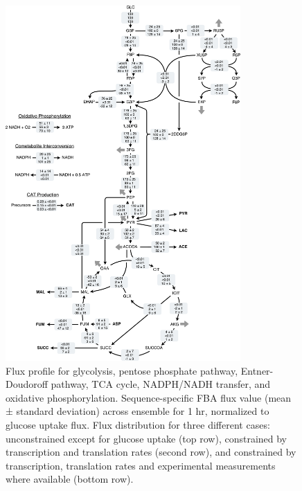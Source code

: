 \documentclass[12pt]{article}
\begin{document}
\begin{figure}[ht]
\centering
\includegraphics[width=0.8\textwidth]{./Figures/CAT_flux_final.pdf}
\caption{Flux profile for glycolysis, pentose phosphate pathway, Entner-Doudoroff pathway, TCA cycle, NADPH/NADH transfer, and oxidative phosphorylation. Sequence-specific FBA flux value (mean ± standard deviation) across ensemble for 1 hr, normalized to glucose uptake flux. Flux distribution for three different cases: unconstrained except for glucose uptake (top row), constrained by transcription and translation rates (second row), and constrained by transcription, translation rates and experimental measurements where available (bottom row).}
\label{fig:Network}
\end{figure}

\clearpage

\renewcommand\thefigure{S\arabic{figure}}
\renewcommand\thetable{T\arabic{table}}
\renewcommand\thepage{S-\arabic{page}}
\renewcommand\theequation{S\arabic{equation}}

\setcounter{equation}{0}
\setcounter{table}{0}
\setcounter{figure}{0}
\setcounter{page}{1}

\end{document}
